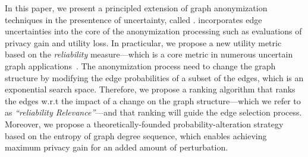 
\vspace{2mm}


In this paper, we present a principled extension of graph anonymization techniques in the presentence of uncertainty, called \SysNameNS. 
\SysName incorporates edge uncertainties into the core of the  anonymization processing such as evaluations of privacy gain and utility loss. 
In practicular, we propose a new utility metric based on the {\em reliability} measure---which is a core metric in numerous uncertain graph applications~\cite{Asthana_Predicting_2004,Zhao_Detecting_2014,Ghosh_On_2007}. 
The anonymization process need to change the graph structure by modifying the edge probabilities of a subset of the edges, which is an exponential search space. 
Therefore, we propose a ranking algorithm that ranks the edges w.r.t the impact of a change on the graph structure---which we refer to as {\em ``reliability Relevance''}---and 
that ranking will guide the edge selection process. 
Moreover, we propose a theoretically-founded probability-alteration strategy based on the entropy of graph degree sequence, which enables achieving maximum privacy gain for an added amount of 
perturbation. 





